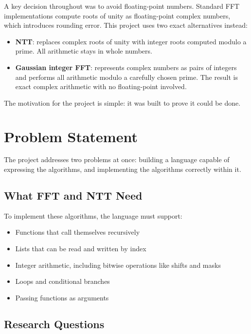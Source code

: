 \documentclass[conference]{IEEEtran}
\begin{document}
A key decision throughout was to avoid floating-point numbers. Standard FFT implementations compute roots of unity as floating-point complex numbers, which introduces rounding error. This project uses two exact alternatives instead:

\begin{itemize}
    \item \textbf{NTT}: replaces complex roots of unity with integer roots computed modulo a prime. All arithmetic stays in whole numbers.
    \item \textbf{Gaussian integer FFT}: represents complex numbers as pairs of integers and performs all arithmetic modulo a carefully chosen prime. The result is exact complex arithmetic with no floating-point involved.
\end{itemize}

The motivation for the project is simple: it was built to prove it could be done.

\section{Problem Statement}

The project addresses two problems at once: building a language capable of expressing the algorithms, and implementing the algorithms correctly within it.

\subsection{What FFT and NTT Need}

To implement these algorithms, the language must support:

\begin{itemize}
    \item Functions that call themselves recursively
    \item Lists that can be read and written by index
    \item Integer arithmetic, including bitwise operations like shifts and masks
    \item Loops and conditional branches
    \item Passing functions as arguments
\end{itemize}

\subsection{Research Questions}
\end{document}
